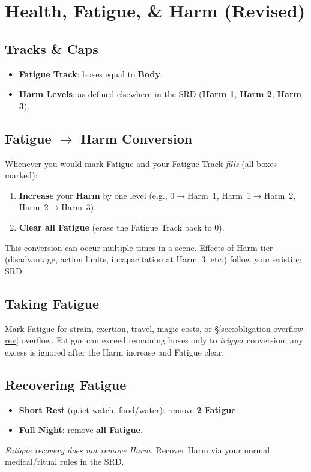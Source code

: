 \section{Health, Fatigue, \& Harm (Revised)}
\label{sec:health-fatigue-harm-rev}

\subsection*{Tracks \& Caps}
\begin{itemize}
  \item \textbf{Fatigue Track}: boxes equal to \textbf{Body}.
  \item \textbf{Harm Levels}: as defined elsewhere in the SRD (\textbf{Harm 1}, \textbf{Harm 2}, \textbf{Harm 3}).
\end{itemize}

\subsection*{Fatigue $\rightarrow$ Harm Conversion}
Whenever you would mark Fatigue and your Fatigue Track \emph{fills} (all boxes marked):
\begin{enumerate}
  \item \textbf{Increase} your \textbf{Harm} by one level (e.g., 0$\rightarrow$Harm~1, Harm~1$\rightarrow$Harm~2, Harm~2$\rightarrow$Harm~3).
  \item \textbf{Clear all Fatigue} (erase the Fatigue Track back to 0).
\end{enumerate}
This conversion can occur multiple times in a scene. Effects of Harm tier (disadvantage, action limits, incapacitation at Harm~3, etc.) follow your existing SRD.

\subsection*{Taking Fatigue}
Mark Fatigue for strain, exertion, travel, magic costs, or \S\ref{sec:obligation-overflow-rev} overflow. Fatigue can exceed remaining boxes only to \emph{trigger} conversion; any excess is ignored after the Harm increase and Fatigue clear.

\subsection*{Recovering Fatigue}
\begin{itemize}
  \item \textbf{Short Rest} (quiet watch, food/water): remove \textbf{2 Fatigue}.
  \item \textbf{Full Night}: remove \textbf{all Fatigue}.
\end{itemize}
\emph{Fatigue recovery does not remove Harm.} Recover Harm via your normal medical/ritual rules in the SRD.

